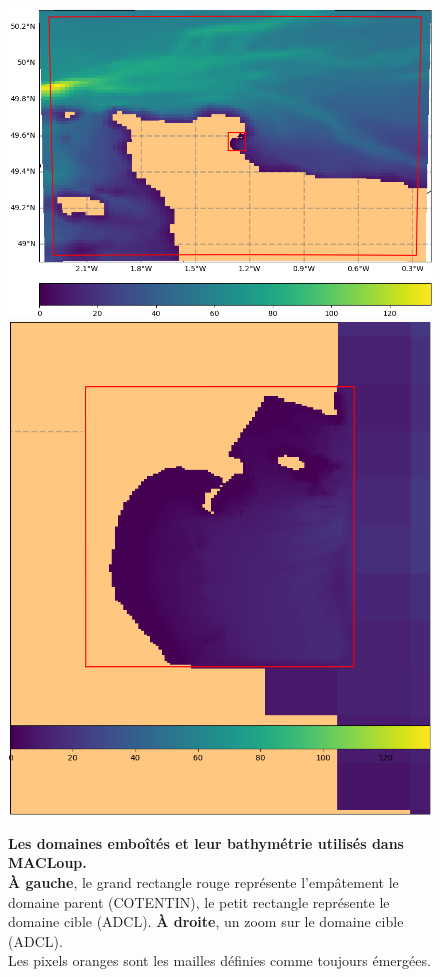 \documentclass[10pt,a4paper,titlepage]{article}
\begin{document}
\begin{figure}[H]
	\centering
	\includegraphics[scale=0.35]{../images/COTENTIN_ADCL5.png}
	\includegraphics[scale=0.25]{../images/ADCL5.png}
	\caption{
		\textbf{Les domaines emboîtés et leur bathymétrie utilisés dans MACLoup.}\\
		\textbf{À gauche}, le grand rectangle rouge représente l'empâtement le domaine parent (COTENTIN), le petit rectangle représente le domaine cible (ADCL).
		\textbf{À droite}, un zoom sur le domaine cible (ADCL).
		\\
		Les pixels oranges sont les mailles définies comme toujours émergées.
	}
	\label{fig:imbrication}
\end{figure}
\end{document}
